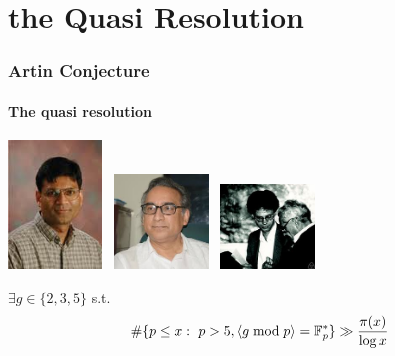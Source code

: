 \documentclass[10pt,handout]{beamer} %
\begin{document}
\section{the Quasi Resolution}

\begin{frame}\frametitle{Artin Conjecture}
\framesubtitle{The quasi resolution}\pause


\centerline{
\includegraphics[width=2.5cm]{images/gupta.jpg}
\
\includegraphics[width=2.5cm]{images/murty.jpg}
\
\includegraphics[width=2.5cm]{images/heathbrown.jpg}
}\pause


\begin{theorem} $\exists g\in\{2,3,5\}$ s.t.
 $$\#\{p\le x:\ p>5, \langle g\bmod p\rangle=\mathbb F_p^*\}\gg\frac{\pi(x)}{\log x}$$
\end{theorem}
\end{frame}
\end{document}
